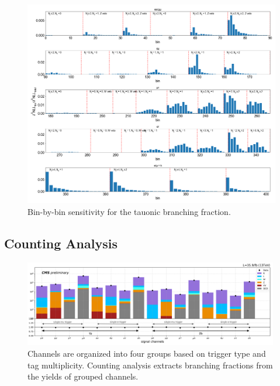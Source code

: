 \begin{figure}[htb!]
    \centering
    \includegraphics[width=1.2\textwidth, angle=-90]{chapters/Analysis/sectionStatisticalAnalysis/figures/beta_tau_scan_bins_lh}
    \caption{Bin-by-bin sensitivity for the tauonic branching fraction.}
    \label{fig:analysis:method:mle:tau_scan_bins}
\end{figure}


\FloatBarrier




\subsection{Counting Analysis}


\begin{figure}[htb!]
    \centering
    \includegraphics[width=0.99\textwidth]{chapters/Analysis/sectionStatisticalAnalysis/figures/counting.png}
    \caption{ Channels are organized into four groups based on trigger type and \PQb tag multiplicity. Counting analysis extracts \PW branching fractions from the yields of grouped channels.}
    \label{fig:analysis:method:counting:groupsofchannel}
\end{figure}

